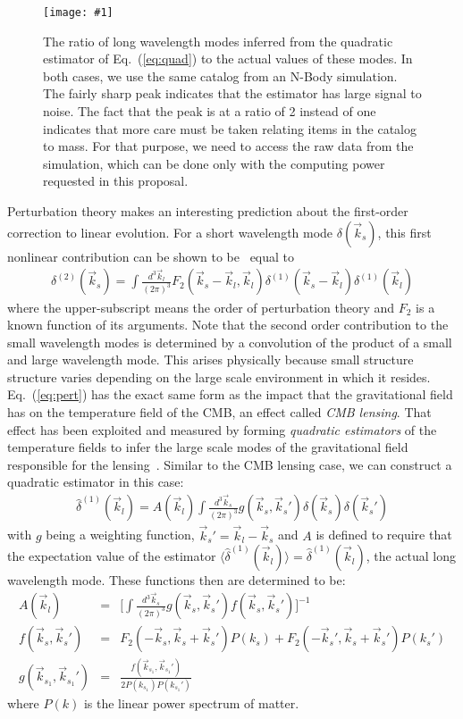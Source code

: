 \documentclass[12pt]{article}
\newcommand{\sfig}[2]{
\begin{center}
\texttt{[image: \#1]}
\end{center}
        }
\newcommand{\Spng}[2]{
    \begin{figure}[htb]
    \sfig{#1.png}{.9\columnwidth}
    \caption{{\small #2}}
    \label{fig:#1}
    \end{figure}
}
\newcommand{\ec}[1]{Eq.~(\ref{eq:#1})}
\newcommand{\eql}[1]{\label{eq:#1}}
\begin{document}
\begin{small}
\Spng{nbody}{The ratio of long wavelength modes inferred from the quadratic estimator of \ec{quad} to the actual values of these modes. In both cases, we use the same catalog from an N-Body simulation. The fairly sharp peak indicates that the estimator has large signal to noise. The fact that the peak is at a ratio of 2 instead of one indicates that more care must be taken relating items in the catalog to mass. For that purpose, we need to access the raw data from the simulation, which can be done only with the computing power requested in this proposal.}


Perturbation theory makes an interesting prediction about the first-order correction to linear evolution. For a short wavelength mode $\delta(\vec{k}_s)$, this first nonlinear contribution can be shown to be~\cite{Bernardeau:2001qr} equal to 
\begin{eqnarray}
\delta^{(2)}(\vec{k}_s)=\int\frac{d^{3}\vec{k}_l}{(2 \pi)^3}F_2(\vec{k}_s-\vec{k}_l,\vec{k}_l)\delta^{(1)}(\vec{k}_s-\vec{k}_l)\delta^{(1)}(\vec{k}_l)\eql{pert}
\end{eqnarray}
where the upper-subscript means the order of perturbation theory and $F_2$ is a known function of its arguments. Note that the second order contribution to the small wavelength modes is determined by a convolution of the product of a small and large wavelength mode. 
This arises physically because small structure structure varies depending on the large scale environment in which it resides. \ec{pert} has the exact same form as the impact that the gravitational field has on the temperature field of the CMB, an effect called \emph{CMB lensing}. That effect has been exploited and measured by forming \emph{quadratic estimators} of the temperature fields to infer the large scale modes of the gravitational field responsible for the lensing~\cite{Hu:2001tn}.
Similar to the CMB lensing case, we can construct a quadratic estimator in this case:
\begin{eqnarray}
\hat{\delta}^{(1)}(\vec{k}_l)=A(\vec{k}_l)\int \frac{d^3 \vec{k}_s}{(2\pi)^3} g(\vec{k}_s,\vec{k}_s')\delta(\vec{k}_s)\delta(\vec{k}_s')\eql{quad}
\end{eqnarray}
with $g$ being a weighting function, $\vec{k}_s'=\vec{k}_l-\vec{k}_s$ and $A$ is defined to require that the expectation value of the estimator $\langle \hat{\delta}^{(1)}(\vec{k}_l) \rangle=\hat{\delta}^{(1)}(\vec{k}_l)$, the actual long wavelength mode. These functions then are determined to be:
\begin{eqnarray}
A(\vec{k}_l)&=&\bigg[\int \frac{d^3 \vec{k}_s}{(2\pi)^3} g(\vec{k}_s,\vec{k}_s')f(\vec{k}_s,\vec{k}_s')  \bigg]^{-1} \\
f(\vec{k}_s,\vec{k}_s')&=&F_2(-\vec{k}_s,\vec{k}_s+\vec{k}_s')P(k_s)+F_2(-\vec{k}_s',\vec{k}_s+\vec{k}_s')P(k_s') \\
g(\vec{k}_{s_1},\vec{k}_{s_1}')&=&\frac{f(\vec{k}_{s_1},\vec{k}_{s_1}')}{2P(k_{s_1})P(k_{s_1}')}
\end{eqnarray}
where $P(k)$ is the linear power spectrum of matter.


\end{small}
\end{document}
